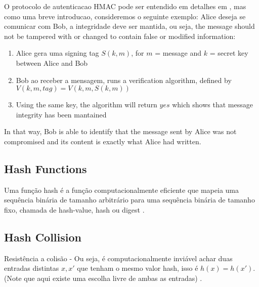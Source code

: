 \documentclass[12pt]{article}
\begin{document}
O protocolo de autenticacao HMAC pode ser entendido em detalhes em \cite{krawczyk1997hmac}, mas como uma breve
introducao, consideremos o seguinte exemplo: Alice deseja se comunicar com Bob, a integridade deve ser
mantida, ou seja, the message should not be tampered with or changed to contain false or modified information:
\begin{enumerate}
\item Alice gera uma signing tag \(S(k, m)\), for \(m\) = message and \(k\) = secret key between Alice and Bob
\item Bob ao receber a mensagem, runs a verification algorithm, defined by \(V(k, m, tag) = V(k, m, S(k, m))\)
\item Using the same key, the algorithm will return \(yes\) which shows that message integrity has been mantained
\end{enumerate}

In that way, Bob is able to identify that the message sent by Alice was not compromised and its content
is exactly what Alice had written.

\fi

\subsection{Hash Functions}

Uma função hash é a função computacionalmente eficiente que mapeia uma sequência binária de tamanho 
arbitrário para uma sequência binária de tamanho fixo, chamada de hash-value, hash ou digest \cite{menezes1996handbook}. 


\subsection{Hash Collision}

Resistência a colisão - Ou seja, é computacionalmente inviável achar duas entradas distintas \(x, x'\)
que tenham o mesmo valor hash, isso é \(h(x) = h(x')\). (Note que aqui existe uma escolha livre de 
ambas as entradas) \cite{menezes1996handbook}.

\end{document}
